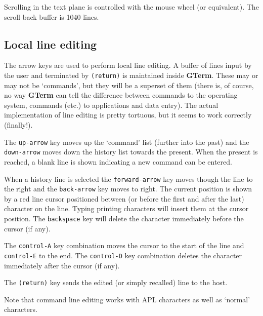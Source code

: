 \documentclass[a4paper,twoside,11pt]{article}
\newcommand{\newpara}{\par\vspace{4mm}\noindent}
\begin{document}
\newpara
Scrolling in the text plane is controlled with the mouse wheel (or equivalent). The scroll back buffer is 1040 lines.

\subsection{Local line editing}
The arrow keys are used to perform local line editing. A buffer of lines input by the user
and terminated by \texttt{(return)} is maintained inside \textbf{GTerm}. These may or may not be `commands', but they will be
a superset of them (there is, of course, no way \textbf{GTerm} can tell the difference between commands to the operating system,
commands (etc.) to applications and data entry). The actual implementation of line editing is pretty tortuous, but it 
seems to work correctly (finally!).

\newpara
The \texttt{up-arrow} key moves up the `command' list (further into the past) and the \texttt{down-arrow} moves down
the history list towards the present. When the present is reached, a blank line is shown indicating a new command can be
entered.

\newpara
When a history line is selected the \texttt{forward-arrow} key moves though the line to the right and the
\texttt{back-arrow} key moves to right. The current position is shown by a red line cursor positioned between
(or before the first and after the last) character on the line. Typing printing characters will insert them at the
cursor position. The \texttt{backspace} key will delete the character immediately before the cursor (if any).

\newpara
The \texttt{control-A} key combination moves the cursor to the start of the line and \texttt{control-E} to the end.
The \texttt{control-D} key combination deletes the character immediately after the cursor (if any).

\newpara
The \texttt{(return)} key sends the edited (or simply recalled) line to the host.

\newpara
Note that command line editing works with APL characters as well as `normal' characters.
\end{document}
